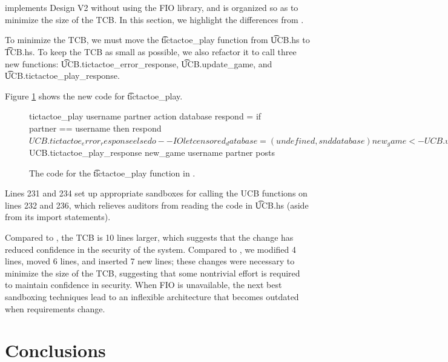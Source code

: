\begin{refsection}
\section{\viiNm}

\myapp{} \viiNm{} implements Design V2 without using the FIO library,
and is organized so as to minimize the size of the TCB.
%
In this section, we highlight the differences from \viiN{}.

To minimize the TCB,
we must move the \t{tictactoe\_play} function from \t{UCB.hs} to \t{TCB.hs}.
%
To keep the TCB as small as possible,
we also refactor it to call three new functions:
\t{UCB.tictactoe\_error\_response}, \t{UCB.update\_game}, and \t{UCB.tictactoe\_play\_response}.

Figure \ref{code_tictactoe_play} shows the new code for \t{tictactoe\_play}.
\begin{figure}
\begin{fb}
tictactoe_play username partner action database respond =
  if partner == username then
    respond $ UCB.tictactoe_error_response
  else do  --IO
    let censored_database = (undefined, snd database)
    new_game <- UCB.update_game username partner action censored_database
    labeled_posts <- readIORef (fst database)
    let d = filter_posts (Whitelist [username]) labeled_posts
    let posts = flatten d
    respond $ UCB.tictactoe_play_response new_game username partner posts
\end{fb}
\caption{The code for the \t{tictactoe\_play} function in \viiNm{}.}
\label{code_tictactoe_play}
\end{figure}
Lines 231 and 234 set up appropriate sandboxes for calling the UCB functions on lines 232 and 236,
which relieves auditors from reading the code in \t{UCB.hs} (aside from its import statements).

Compared to \viN{},
the TCB is 10 lines larger,
which suggests that the change has reduced confidence in the security of the system.
%
Compared to \viiN{},
we modified 4 lines, moved 6 lines, and inserted 7 new lines;
these changes were necessary to minimize the size of the TCB,
suggesting that some nontrivial effort is required to maintain confidence in security.
%
When FIO is unavailable,
the next best sandboxing techniques lead to an inflexible architecture that becomes outdated when requirements change.

\section{Conclusions}


\end{refsection}
